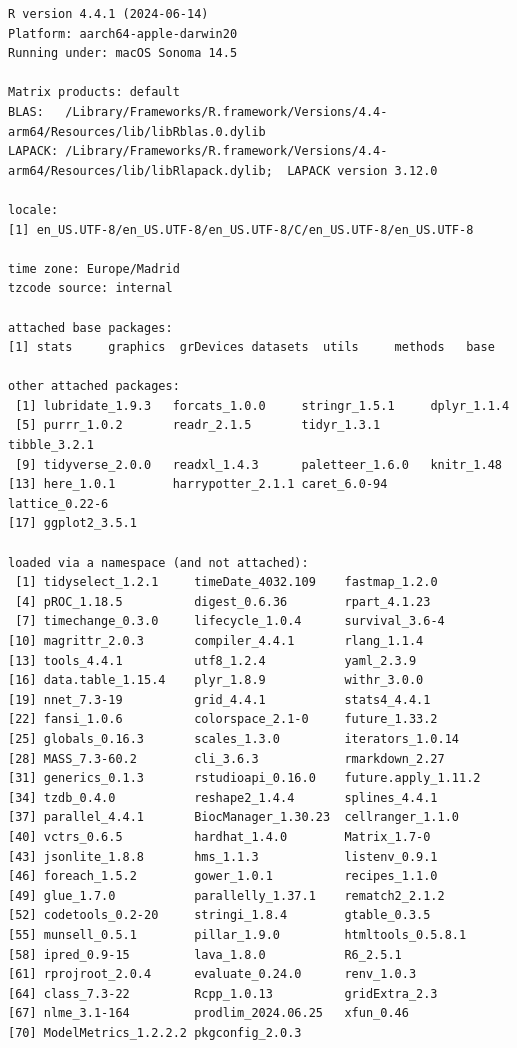 \documentclass[
  letterpaper,
  DIV=11,
  numbers=noendperiod]{scrreprt}
\begin{document}
\begin{verbatim}
R version 4.4.1 (2024-06-14)
Platform: aarch64-apple-darwin20
Running under: macOS Sonoma 14.5

Matrix products: default
BLAS:   /Library/Frameworks/R.framework/Versions/4.4-arm64/Resources/lib/libRblas.0.dylib 
LAPACK: /Library/Frameworks/R.framework/Versions/4.4-arm64/Resources/lib/libRlapack.dylib;  LAPACK version 3.12.0

locale:
[1] en_US.UTF-8/en_US.UTF-8/en_US.UTF-8/C/en_US.UTF-8/en_US.UTF-8

time zone: Europe/Madrid
tzcode source: internal

attached base packages:
[1] stats     graphics  grDevices datasets  utils     methods   base     

other attached packages:
 [1] lubridate_1.9.3   forcats_1.0.0     stringr_1.5.1     dplyr_1.1.4      
 [5] purrr_1.0.2       readr_2.1.5       tidyr_1.3.1       tibble_3.2.1     
 [9] tidyverse_2.0.0   readxl_1.4.3      paletteer_1.6.0   knitr_1.48       
[13] here_1.0.1        harrypotter_2.1.1 caret_6.0-94      lattice_0.22-6   
[17] ggplot2_3.5.1    

loaded via a namespace (and not attached):
 [1] tidyselect_1.2.1     timeDate_4032.109    fastmap_1.2.0       
 [4] pROC_1.18.5          digest_0.6.36        rpart_4.1.23        
 [7] timechange_0.3.0     lifecycle_1.0.4      survival_3.6-4      
[10] magrittr_2.0.3       compiler_4.4.1       rlang_1.1.4         
[13] tools_4.4.1          utf8_1.2.4           yaml_2.3.9          
[16] data.table_1.15.4    plyr_1.8.9           withr_3.0.0         
[19] nnet_7.3-19          grid_4.4.1           stats4_4.4.1        
[22] fansi_1.0.6          colorspace_2.1-0     future_1.33.2       
[25] globals_0.16.3       scales_1.3.0         iterators_1.0.14    
[28] MASS_7.3-60.2        cli_3.6.3            rmarkdown_2.27      
[31] generics_0.1.3       rstudioapi_0.16.0    future.apply_1.11.2 
[34] tzdb_0.4.0           reshape2_1.4.4       splines_4.4.1       
[37] parallel_4.4.1       BiocManager_1.30.23  cellranger_1.1.0    
[40] vctrs_0.6.5          hardhat_1.4.0        Matrix_1.7-0        
[43] jsonlite_1.8.8       hms_1.1.3            listenv_0.9.1       
[46] foreach_1.5.2        gower_1.0.1          recipes_1.1.0       
[49] glue_1.7.0           parallelly_1.37.1    rematch2_2.1.2      
[52] codetools_0.2-20     stringi_1.8.4        gtable_0.3.5        
[55] munsell_0.5.1        pillar_1.9.0         htmltools_0.5.8.1   
[58] ipred_0.9-15         lava_1.8.0           R6_2.5.1            
[61] rprojroot_2.0.4      evaluate_0.24.0      renv_1.0.3          
[64] class_7.3-22         Rcpp_1.0.13          gridExtra_2.3       
[67] nlme_3.1-164         prodlim_2024.06.25   xfun_0.46           
[70] ModelMetrics_1.2.2.2 pkgconfig_2.0.3     
\end{verbatim}
\end{document}
